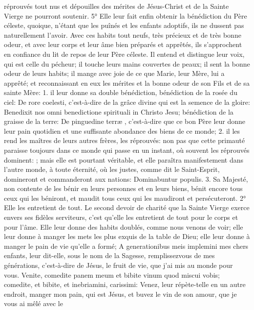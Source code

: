 réprouvés tout nus et dépouilles des mérites de Jésus-Christ et de la Sainte Vierge ne pourront soutenir.
 5° Elle leur fait enfin obtenir la bénédiction du Père céleste, quoique, n'étant que les puînés et les enfants
adoptifs, ils ne dussent pas naturellement l'avoir. Avec ces habits tout neufs, très précieux et de très bonne odeur,
et avec leur corps et leur âme bien préparés et apprêtés, ils s'approchent en confiance du lit de repos de leur Père
céleste. Il entend et distingue leur voix, qui est celle du pécheur; il touche leurs mains couvertes de peaux; il sent
la bonne odeur de leurs habits; il mange avec joie de ce que Marie, leur Mère, lui a apprêté; et reconnaissant en
eux les mérites et la bonne odeur de son Fils et de sa sainte Mère: 1. il leur donne sa double bénédiction,
bénédiction de la rosée du ciel: De rore coelesti, c'est-à-dire de la grâce divine qui est la semence de la gloire:
Benedixit nos omni benedictione spirituali in Christo Jesu; bénédiction de la graisse de la terre: De pinguedine
terræ , c'est-à-dire que ce bon Père leur donne leur pain quotidien et une suffisante abondance des biens de ce
monde; 2. il les rend les maîtres de leurs autres frères, les réprouvés: non pas que cette primauté paraisse
toujours dans ce monde qui passe en un instant, où souvent les réprouvés dominent: ; mais elle est pourtant véritable, et elle paraîtra
manifestement dans l'autre monde, à toute éternité, où les justes, comme dit le Saint-Esprit, domineront et
commanderont aux nations: Dominabuntur populis. 3. Sa Majesté, non contente de les bénir en leurs personnes et
en leurs biens, bénit encore tous ceux qui les béniront, et maudit tous ceux qui les maudiront et persécuteront.
2° Elle les entretient de tout.
 Le second devoir de charité que la Sainte Vierge exerce envers ses fidèles serviteurs, c'est qu'elle les
entretient de tout pour le corps et pour l'âme. Elle leur donne des habits doublés, comme nous venons de voir; elle
leur donne à manger les mets les plus exquis de la table de Dieu; elle leur donne à manger le pain de vie qu'elle a
formé; A generationibus meis implemini mes chers enfants, leur dit-elle, sous le nom de la Sagesse, remplissezvous de mes générations, c'est-à-dire de Jésus, le fruit de vie, que j'ai mis au monde pour vous. Venite, comedite
panem meum et bibite vinum quod miscui vobis; comedite, et bibite, et inebriamini, carissimi: Venez, leur répète-telle en un autre endroit, manger mon pain, qui est Jésus, et buvez le vin de son amour, que je vous ai mêlé avec le
